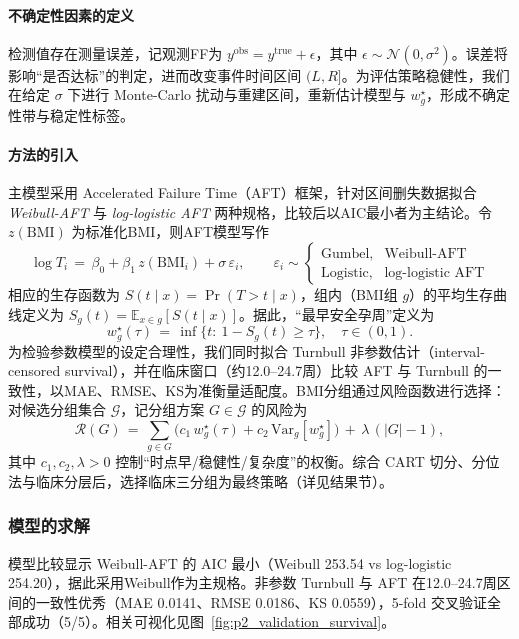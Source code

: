 \documentclass[withoutpreface]{cumcmthesis}
\begin{document}
\paragraph{不确定性因素的定义}
检测值存在测量误差，记观测FF为 $y^{\text{obs}}=y^{\text{true}}+\epsilon$，其中 $\epsilon\sim\mathcal N(0,\sigma^2)$。误差将影响“是否达标”的判定，进而改变事件时间区间 $(L,R]$。为评估策略稳健性，我们在给定 $\sigma$ 下进行 Monte-Carlo 扰动与重建区间，重新估计模型与 $w_g^{\star}$，形成不确定性带与稳定性标签。
\paragraph{方法的引入}
主模型采用 Accelerated Failure Time（AFT）框架，针对区间删失数据拟合 \emph{Weibull-AFT} 与 \emph{log-logistic AFT} 两种规格，比较后以AIC最小者为主结论。令 $z(\mathrm{BMI})$ 为标准化BMI，则AFT模型写作
\[
\log T_i \,=\, \beta_0 + \beta_1\, z(\mathrm{BMI}_i) + \sigma\,\varepsilon_i,\qquad \varepsilon_i\sim\begin{cases}
\text{Gumbel}, & \text{Weibull-AFT}\\
\text{Logistic}, & \text{log-logistic AFT}\end{cases}
\]
相应的生存函数为 $S(t\mid x)=\Pr(T>t\mid x)$，组内（BMI组 $g$）的平均生存曲线定义为 $S_g(t)=\mathbb E_{x\in g}[S(t\mid x)]$。据此，“最早安全孕周”定义为
\[
w_g^{\star}(\tau)\,=\,\inf\{t:\ 1-S_g(t)\ge \tau\},\quad \tau\in(0,1).
\]
为检验参数模型的设定合理性，我们同时拟合 Turnbull 非参数估计（interval-censored survival），并在临床窗口（约12.0–24.7周）比较 AFT 与 Turnbull 的一致性，以MAE、RMSE、KS为准衡量适配度。BMI分组通过风险函数进行选择：对候选分组集合 $\mathcal G$，记分组方案 $G\in\mathcal G$ 的风险为
\[
\mathcal R(G)\,=\, \sum_{g\in G} \Big( c_1\,w_g^{\star}(\tau)+c_2\,\mathrm{Var}_g[w_g^{\star}]\Big)\,+\,\lambda\,(|G|-1),
\]
其中 $c_1,c_2,\lambda>0$ 控制“时点早/稳健性/复杂度”的权衡。综合 CART 切分、分位法与临床分层后，选择临床三分组为最终策略（详见结果节）。
\subsubsection{模型的求解}
模型比较显示 Weibull-AFT 的 AIC 最小（Weibull 253.54 vs log-logistic 254.20），据此采用Weibull作为主规格。非参数 Turnbull 与 AFT 在12.0–24.7周区间的一致性优秀（MAE 0.0141、RMSE 0.0186、KS 0.0559），5-fold 交叉验证全部成功（5/5）。相关可视化见图~\ref{fig:p2_validation_survival}。
\end{document}
